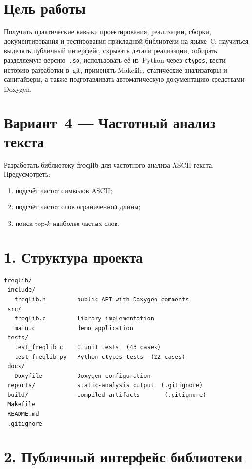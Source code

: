 \section*{Цель работы}

Получить практические навыки проектирования, реализации, сборки,
документирования и тестирования прикладной библиотеки на языке~C:
научиться выделять публичный интерфейс, скрывать детали реализации,
собирать разделяемую версию~\texttt{.so}, использовать её из~Python
через \texttt{ctypes}, вести историю разработки в~git, применять
Makefile, статические анализаторы и санитайзеры, а также подготавливать
автоматическую документацию средствами Doxygen.

\HRule

\section*{Вариант~4 — Частотный анализ текста}

Разработать библиотеку \textbf{freqlib} для частотного анализа
ASCII-текста.  Предусмотреть:
\begin{enumerate}
    \item подсчёт частот символов ASCII;
    \item подсчёт частот слов ограниченной длины;
    \item поиск top-$k$ наиболее частых слов.
\end{enumerate}

\HRule

\section*{1. Структура проекта}

\begin{lstlisting}[style=Bashstyle]
freqlib/
 include/
   freqlib.h         public API with Doxygen comments
 src/
   freqlib.c         library implementation
   main.c            demo application
 tests/
   test_freqlib.c    C unit tests  (43 cases)
   test_freqlib.py   Python ctypes tests  (22 cases)
 docs/
   Doxyfile          Doxygen configuration
 reports/            static-analysis output  (.gitignore)
 build/              compiled artifacts       (.gitignore)
 Makefile
 README.md
 .gitignore
\end{lstlisting}

\HRule

\section*{2. Публичный интерфейс библиотеки}


